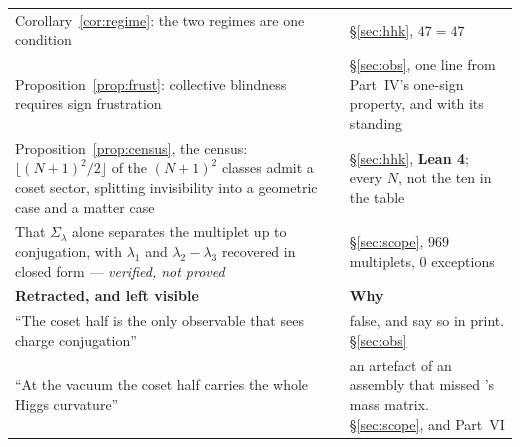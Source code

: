 \documentclass[11pt,a4paper]{article}
\newcommand{\Sig}{\Sigma_\lambda}
\begin{document}
\begin{longtable}{p{7.1cm} p{8.1cm}}
Corollary~\ref{cor:regime}: the two regimes are one condition & \S\ref{sec:hhk}, $47=47$\\
Proposition~\ref{prop:frust}: collective blindness requires sign frustration & \S\ref{sec:obs}, one
line from Part~IV's one-sign property, and with its standing\\
Proposition~\ref{prop:census}, the census: $\lfloor(N+1)^2/2\rfloor$ of the $(N+1)^2$ classes admit a
coset sector, splitting invisibility into a geometric case and a matter case &
\S\ref{sec:hhk}, \textbf{\color{okgreen}Lean 4}; every $N$, not the ten in the table\\
That $\Sig$ alone separates the multiplet up to conjugation, with $\lambda_1$ and
$\lambda_2-\lambda_3$ recovered in closed form --- \emph{verified, not proved} & \S\ref{sec:scope},
$969$ multiplets, $0$ exceptions\\
\midrule
\rowcolor{warmred!14}\textbf{Retracted, and left visible} & \textbf{Why}\\
\midrule
``The coset half is the only observable that sees charge conjugation'' & false, and \cite{KKKY} say
so in print. \S\ref{sec:obs}\\
``At the vacuum the coset half carries the whole Higgs curvature'' & an artefact of an assembly that
missed \cite{AHMN}'s mass matrix. \S\ref{sec:scope}, and Part~VI\\
\bottomrule
\end{longtable}
\endgroup
\end{document}
